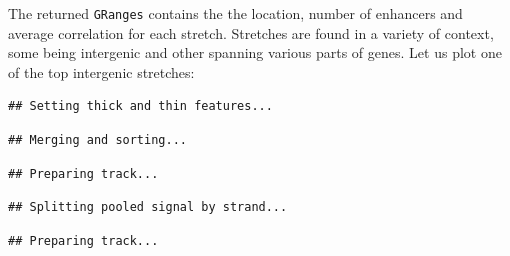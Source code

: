 \documentclass[9pt,a4paper,]{extarticle}
\newenvironment{Shaded}{\begin{snugshade}}{\end{snugshade}}
\newcommand{\KeywordTok}[1]{\textcolor[rgb]{0.13,0.29,0.53}{\textbf{{#1}}}}
\newcommand{\DataTypeTok}[1]{\textcolor[rgb]{0.13,0.29,0.53}{{#1}}}
\newcommand{\DecValTok}[1]{\textcolor[rgb]{0.00,0.00,0.81}{{#1}}}
\newcommand{\StringTok}[1]{\textcolor[rgb]{0.31,0.60,0.02}{{#1}}}
\newcommand{\CommentTok}[1]{\textcolor[rgb]{0.56,0.35,0.01}{\textit{{#1}}}}
\newcommand{\OtherTok}[1]{\textcolor[rgb]{0.56,0.35,0.01}{{#1}}}
\newcommand{\NormalTok}[1]{{#1}}
\begin{document}
The returned \texttt{GRanges} contains the the location, number of enhancers and average correlation for each stretch. Stretches are found in a variety of context, some being intergenic and other spanning various parts of genes. Let us plot one of the top intergenic stretches:

\begin{Shaded}
\end{Shaded}

\begin{verbatim}
## Setting thick and thin features...
\end{verbatim}

\begin{verbatim}
## Merging and sorting...
\end{verbatim}

\begin{verbatim}
## Preparing track...
\end{verbatim}

\begin{Shaded}
\end{Shaded}

\begin{verbatim}
## Splitting pooled signal by strand...
\end{verbatim}

\begin{verbatim}
## Preparing track...
\end{verbatim}
\end{document}
